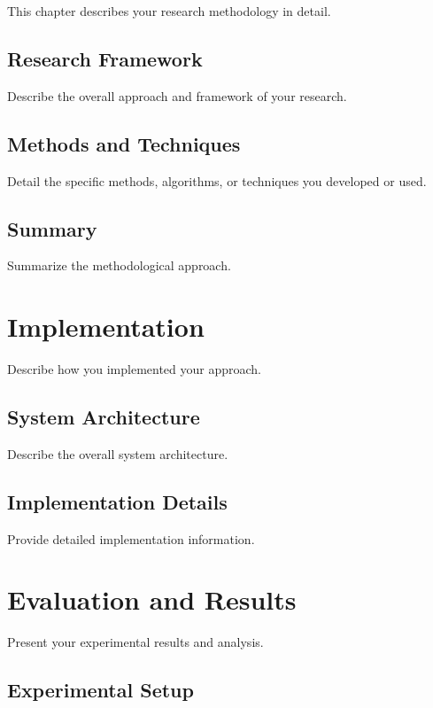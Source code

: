 \documentclass[12pt, oneside]{book}
\theoremstyle{definition}
\theoremstyle{remark}
\begin{document}
This chapter describes your research methodology in detail.

\section{Research Framework}
\label{sec:framework}

Describe the overall approach and framework of your research.

\section{Methods and Techniques}
\label{sec:methods}

Detail the specific methods, algorithms, or techniques you developed or used.

\section{Summary}
\label{sec:method-summary}

Summarize the methodological approach.

\chapter{Implementation}
\label{chap:implementation}

Describe how you implemented your approach.

\section{System Architecture}
\label{sec:architecture}

Describe the overall system architecture.

\section{Implementation Details}
\label{sec:impl-details}

Provide detailed implementation information.

\chapter{Evaluation and Results}
\label{chap:evaluation}

Present your experimental results and analysis.

\section{Experimental Setup}
\label{sec:setup}
\end{document}
